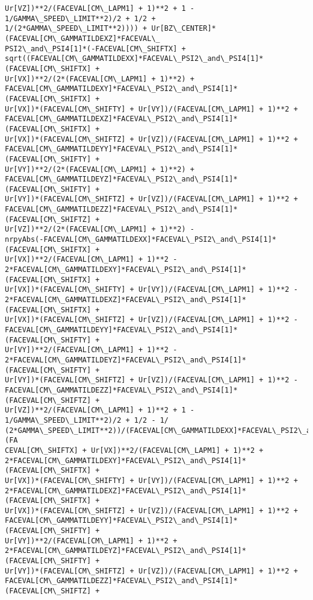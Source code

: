 \documentclass[landscape,letterpaper,10pt,english]{article}
\begin{document}
\begin{Verbatim}[commandchars=\\\{\}]
Ur[VZ])**2/(FACEVAL[CM\_LAPM1] + 1)**2 + 1 - 1/GAMMA\_SPEED\_LIMIT**2)/2 + 1/2 +
1/(2*GAMMA\_SPEED\_LIMIT**2)))) + Ur[BZ\_CENTER]*(FACEVAL[CM\_GAMMATILDEXZ]*FACEVAL\_
PSI2\_and\_PSI4[1]*(-FACEVAL[CM\_SHIFTX] +
sqrt((FACEVAL[CM\_GAMMATILDEXX]*FACEVAL\_PSI2\_and\_PSI4[1]*(FACEVAL[CM\_SHIFTX] +
Ur[VX])**2/(2*(FACEVAL[CM\_LAPM1] + 1)**2) +
FACEVAL[CM\_GAMMATILDEXY]*FACEVAL\_PSI2\_and\_PSI4[1]*(FACEVAL[CM\_SHIFTX] +
Ur[VX])*(FACEVAL[CM\_SHIFTY] + Ur[VY])/(FACEVAL[CM\_LAPM1] + 1)**2 +
FACEVAL[CM\_GAMMATILDEXZ]*FACEVAL\_PSI2\_and\_PSI4[1]*(FACEVAL[CM\_SHIFTX] +
Ur[VX])*(FACEVAL[CM\_SHIFTZ] + Ur[VZ])/(FACEVAL[CM\_LAPM1] + 1)**2 +
FACEVAL[CM\_GAMMATILDEYY]*FACEVAL\_PSI2\_and\_PSI4[1]*(FACEVAL[CM\_SHIFTY] +
Ur[VY])**2/(2*(FACEVAL[CM\_LAPM1] + 1)**2) +
FACEVAL[CM\_GAMMATILDEYZ]*FACEVAL\_PSI2\_and\_PSI4[1]*(FACEVAL[CM\_SHIFTY] +
Ur[VY])*(FACEVAL[CM\_SHIFTZ] + Ur[VZ])/(FACEVAL[CM\_LAPM1] + 1)**2 +
FACEVAL[CM\_GAMMATILDEZZ]*FACEVAL\_PSI2\_and\_PSI4[1]*(FACEVAL[CM\_SHIFTZ] +
Ur[VZ])**2/(2*(FACEVAL[CM\_LAPM1] + 1)**2) -
nrpyAbs(-FACEVAL[CM\_GAMMATILDEXX]*FACEVAL\_PSI2\_and\_PSI4[1]*(FACEVAL[CM\_SHIFTX] +
Ur[VX])**2/(FACEVAL[CM\_LAPM1] + 1)**2 -
2*FACEVAL[CM\_GAMMATILDEXY]*FACEVAL\_PSI2\_and\_PSI4[1]*(FACEVAL[CM\_SHIFTX] +
Ur[VX])*(FACEVAL[CM\_SHIFTY] + Ur[VY])/(FACEVAL[CM\_LAPM1] + 1)**2 -
2*FACEVAL[CM\_GAMMATILDEXZ]*FACEVAL\_PSI2\_and\_PSI4[1]*(FACEVAL[CM\_SHIFTX] +
Ur[VX])*(FACEVAL[CM\_SHIFTZ] + Ur[VZ])/(FACEVAL[CM\_LAPM1] + 1)**2 -
FACEVAL[CM\_GAMMATILDEYY]*FACEVAL\_PSI2\_and\_PSI4[1]*(FACEVAL[CM\_SHIFTY] +
Ur[VY])**2/(FACEVAL[CM\_LAPM1] + 1)**2 -
2*FACEVAL[CM\_GAMMATILDEYZ]*FACEVAL\_PSI2\_and\_PSI4[1]*(FACEVAL[CM\_SHIFTY] +
Ur[VY])*(FACEVAL[CM\_SHIFTZ] + Ur[VZ])/(FACEVAL[CM\_LAPM1] + 1)**2 -
FACEVAL[CM\_GAMMATILDEZZ]*FACEVAL\_PSI2\_and\_PSI4[1]*(FACEVAL[CM\_SHIFTZ] +
Ur[VZ])**2/(FACEVAL[CM\_LAPM1] + 1)**2 + 1 - 1/GAMMA\_SPEED\_LIMIT**2)/2 + 1/2 - 1/
(2*GAMMA\_SPEED\_LIMIT**2))/(FACEVAL[CM\_GAMMATILDEXX]*FACEVAL\_PSI2\_and\_PSI4[1]*(FA
CEVAL[CM\_SHIFTX] + Ur[VX])**2/(FACEVAL[CM\_LAPM1] + 1)**2 +
2*FACEVAL[CM\_GAMMATILDEXY]*FACEVAL\_PSI2\_and\_PSI4[1]*(FACEVAL[CM\_SHIFTX] +
Ur[VX])*(FACEVAL[CM\_SHIFTY] + Ur[VY])/(FACEVAL[CM\_LAPM1] + 1)**2 +
2*FACEVAL[CM\_GAMMATILDEXZ]*FACEVAL\_PSI2\_and\_PSI4[1]*(FACEVAL[CM\_SHIFTX] +
Ur[VX])*(FACEVAL[CM\_SHIFTZ] + Ur[VZ])/(FACEVAL[CM\_LAPM1] + 1)**2 +
FACEVAL[CM\_GAMMATILDEYY]*FACEVAL\_PSI2\_and\_PSI4[1]*(FACEVAL[CM\_SHIFTY] +
Ur[VY])**2/(FACEVAL[CM\_LAPM1] + 1)**2 +
2*FACEVAL[CM\_GAMMATILDEYZ]*FACEVAL\_PSI2\_and\_PSI4[1]*(FACEVAL[CM\_SHIFTY] +
Ur[VY])*(FACEVAL[CM\_SHIFTZ] + Ur[VZ])/(FACEVAL[CM\_LAPM1] + 1)**2 +
FACEVAL[CM\_GAMMATILDEZZ]*FACEVAL\_PSI2\_and\_PSI4[1]*(FACEVAL[CM\_SHIFTZ] +

\end{Verbatim}
\end{document}
